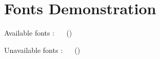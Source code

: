 \documentclass[
]{scrartcl}
\begin{document}
    \pagecolor{black!7.5}
    \section*{Fonts Demonstration}
    \singlespacing

    \noindent\textcolor{wrtxColorSuccess!50!black}{Available fonts} :%
    \ %
    \ ()%

    \noindent\textcolor{wrtxColorDanger!50!black}{Unavailable fonts} :%
    \ %
    \ ()%
\end{document}
